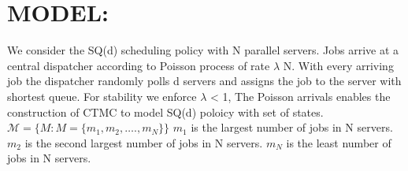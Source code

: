 \documentclass[a4paper,english,12pt]{article}
\begin{document}
\section{ MODEL:}
We consider the SQ(d) scheduling policy with N parallel servers. Jobs arrive at a central dispatcher according to Poisson process of rate $\lambda$ N. With every arriving job the dispatcher randomly polls d servers and assigns the job to the server with shortest queue.
For stability we enforce $\lambda$ < 1,
The Poisson arrivals enables the construction of CTMC to model SQ(d) poloicy with set of states.
$\mathcal{M}= \{M: M= \{m_1, m_2, …., m_N \}\}$
$m_1$ is the largest number of jobs in N servers.
$m_2$ is the second largest number of jobs in N servers.
$m_N$ is the least number of jobs in N servers.
\end{document}
